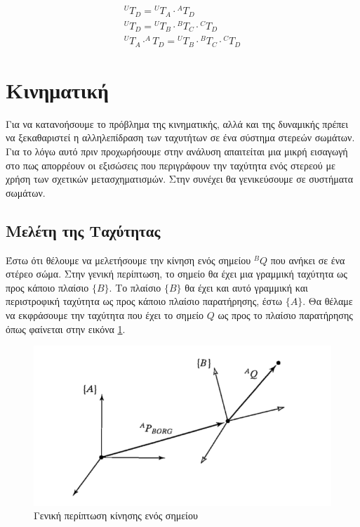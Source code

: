 \begin{equation}
    \begin{aligned}
        ^UT_D = {}^UT_A \cdot {}^AT_D\\[10pt]
        ^UT_D = {}^UT_B \cdot {}^BT_C \cdot {}^CT_D\\[10pt]
        ^UT_A \cdot ^AT_D = {}^UT_B \cdot {}^BT_C \cdot {}^CT_D
    \end{aligned}
    \label{equ:chain}
\end{equation}

\section{Κινηματική}

Για να κατανοήσουμε το πρόβλημα της κινηματικής, αλλά και της δυναμικής πρέπει να ξεκαθαριστεί η αλληλεπίδραση των ταχυτήτων σε ένα σύστημα στερεών σωμάτων. Για το λόγω αυτό πριν προχωρήσουμε στην ανάλυση απαιτείται μια μικρή εισαγωγή στο πως απορρέουν οι εξισώσεις που περιγράφουν την ταχύτητα ενός στερεού με χρήση των σχετικών μετασχηματισμών. Στην συνέχει θα γενικεύσουμε σε συστήματα σωμάτων.

\subsection{Μελέτη της Ταχύτητας}

Έστω ότι θέλουμε να μελετήσουμε την κίνηση ενός σημείου $^BQ$ που ανήκει σε ένα στέρεο σώμα. Στην γενική περίπτωση, το σημείο θα έχει μια γραμμική ταχύτητα ως προς κάποιο πλαίσιο $\{Β\}$. Το πλαίσιο $\{Β\}$ θα έχει και αυτό γραμμική και περιστροφική ταχύτητα ως προς κάποιο πλαίσιο παρατήρησης, έστω $\{Α\}$. Θα θέλαμε να εκφράσουμε την ταχύτητα που έχει το σημείο $Q$ ως προς το πλαίσιο παρατήρησης όπως φαίνεται στην εικόνα \ref{fig:velocity}.

\begin{figure}[H]
    \centering
    \includegraphics[width=.8\textwidth, keepaspectratio]{fig/velocity.png}
    \caption{Γενική περίπτωση κίνησης ενός σημείου \cite{craig95}}
    \label{fig:velocity}
\end{figure}

